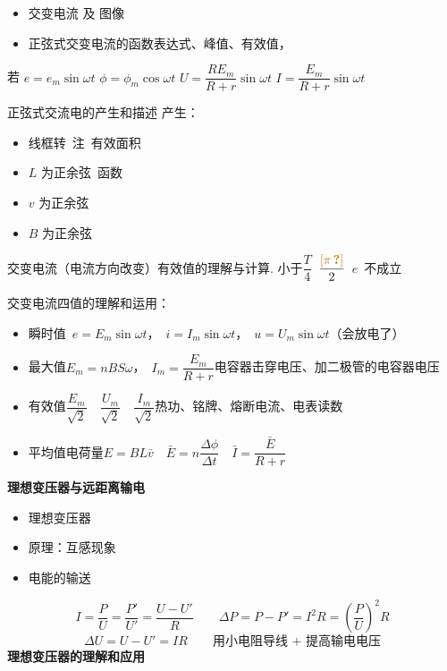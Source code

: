 \begin{itemize}
\item 交变电流 及 图像
\item 正弦式交变电流的函数表达式、峰值、有效值，
\end{itemize}
若 $e=e_m\sin\omega t$ \qquad $\phi=\phi_m\cos\omega t$ \qquad $U=\dfrac{RE_m}{R+r}\sin\omega t$ \qquad $I=\dfrac{E_m}{R+r}\sin\omega t$

正弦式交流电的产生和描述 \quad 产生：
\begin{itemize}
\item 线框转\ 注\ 有效面积
\item $L$ 为正余弦\ 函数
\item $v$ 为正余弦
\item $B$ 为正余弦
\end{itemize}
交变电流（电流方向改变）\quad 有效值的理解与计算. \quad 小于$\dfrac{T}{4}$\ $\dfrac{\unclear{\pi}}{2}$\ $e$\ 不成立

交变电流四值的理解和运用：
\begin{itemize}
\item 瞬时值\ \quad $e=E_m\sin\omega t$，\ $i=I_m\sin\omega t$，\ $u=U_m\sin\omega t$（会放电了）
\item 最大值\quad $E_m=nBS\omega$，\ $I_m=\dfrac{E_m}{R+r}$\quad 电容器击穿电压、加二极管的电容器电压
\item 有效值\quad $\dfrac{E_m}{\sqrt2}$\ \ $\dfrac{U_m}{\sqrt2}$\ \ $\dfrac{I_m}{\sqrt2}$\quad 热功、铭牌、熔断电流、电表读数
\item 平均值\quad {}电荷量\quad $E=BL\bar v$\ \ $\bar E=n\dfrac{\Delta\phi}{\Delta t}$\ \ $\bar I=\dfrac{\bar E}{R+r}$
\end{itemize}
\textbf{理想变压器与远距离输电}
\begin{itemize}
\item 理想变压器
\item 原理：互感现象
\item 电能的输送
\end{itemize}
\[
I=\frac{P}{U}=\frac{P'}{U'}=\frac{U-U'}{R}\qquad \Delta P=P-P'=I^2R=\left(\frac{P}{U}\right)^2R
\]
\[
\Delta U=U-U'=IR\qquad \text{用小电阻导线 + 提高输电电压}
\]
\textbf{理想变压器的理解和应用}

